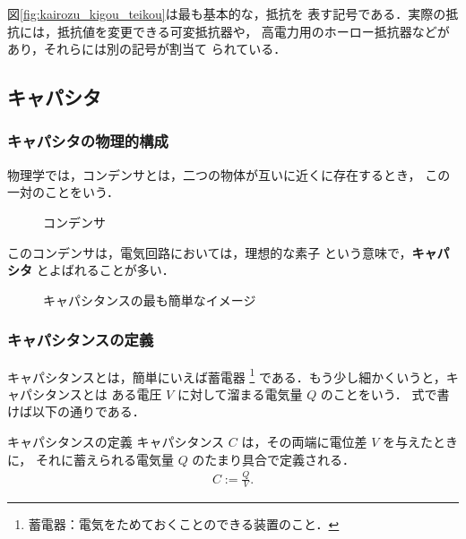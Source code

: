         図\ref{fig:kairozu_kigou_teikou}は最も基本的な，抵抗を
        表す記号である．実際の抵抗には，抵抗値を変更できる可変抵抗器や，
        高電力用のホーロー抵抗器などがあり，それらには別の記号が割当て
        られている．

    \subsection{キャパシタ}
    \subsubsection{キャパシタの物理的構成}
        物理学では，コンデンサとは，二つの物体が互いに近くに存在するとき，
        この一対のことをいう．
                    \begin{figure}[hbt]
                        \begin{center}
                            \caption{コンデンサ}
                            \label{fig:condenser}
                        \end{center}
                    \end{figure}

        このコンデンサは，電気回路においては，理想的な素子
        という意味で，\textbf{キャパシタ} とよばれることが多い．
                    \begin{figure}[hbt]
                        \begin{center}
                            \caption{キャパシタンスの最も簡単なイメージ}
                            \label{fig:capacita_idea}
                        \end{center}
                    \end{figure}

    \subsubsection{キャパシタンスの定義}
        キャパシタンスとは，簡単にいえば蓄電器
            \footnote{
                蓄電器：電気をためておくことのできる装置のこと．
            }
        である．もう少し細かくいうと，キャパシタンスとは
        ある電圧 $V$ に対して溜まる電気量 $Q$ のことをいう．
        式で書けば以下の通りである．
            \begin{myshadebox}{キャパシタンスの定義}
                キャパシタンス $C$ は，その両端に電位差 $V$ を与えたときに，
                それに蓄えられる電気量 $Q$ のたまり具合で定義される．
                \begin{align}
                    C:=\frac{Q}{V}.
                \end{align}
            \end{myshadebox}

